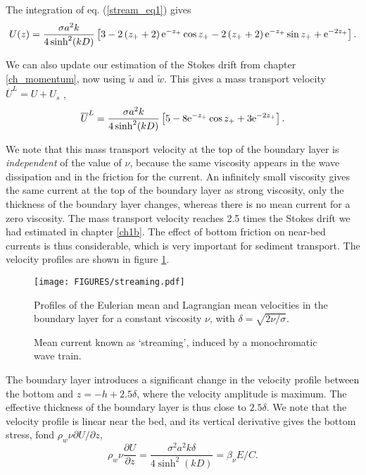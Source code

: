 The integration of eq. (\ref{stream_eq1}) gives 
\begin{equation}
U(z)= \frac{\sigma a^2 k}{4 \sinh^2(kD)} \left[3 - 2 \left(z_+ + 2\right) \mathrm{e}^{- z_+} \cos z_+
- 2 \left(z_+ +2\right) \mathrm{e}^{- z_+} \sin z_+
                                            + \mathrm{e}^{-2 z_+} \right].\label{ruissellement_Eulerien}
\end{equation}

We can also update our estimation of the Stokes drift from chapter \ref{ch_momentum}, now using   $\widetilde{u}$ and
$\widetilde{w}$. This gives a mass transport velocity $\overline{U}^L=U+U_s$ \citep{Longuet-Higgins1953}, 
\begin{equation}
\overline{U}^L= \frac{\sigma a^2 k}{4 \sinh^2(kD)} \left[5 - 8  \mathrm{e}^{- z_+} \cos z_+ +3  \mathrm{e}^{-2 z_+} \right].
\end{equation}

We note that this mass transport velocity at the top of the boundary layer 
is \emph{independent} of the value of $\nu$, because the same viscosity appears in the 
wave dissipation and in the friction for the current. An infinitely small viscosity gives the 
same current at the top of the boundary layer as strong viscosity, only the thickness of the boundary layer changes, whereas there is no mean current for a zero viscosity.
The mass transport velocity reaches 2.5 times the Stokes drift we had estimated in chapter \ref{ch1b}. The 
effect of bottom friction on near-bed currents is thus considerable, which is very important for sediment transport. The velocity profiles are shown in figure \ref{fig_streaming}. 
\begin{figure}
\centerline{\texttt{[image: FIGURES/streaming.pdf]}}
  \caption{Mean current known as `streaming', induced by a monochromatic wave train.}{Profiles of the Eulerian mean and Lagrangian mean 
  velocities in the boundary layer for a constant viscosity $\nu$, with $\delta=\sqrt{2 \nu/\sigma}$.}
   \label{fig_streaming}
\end{figure}
The boundary layer introduces a significant change in the velocity profile between the bottom and  $z=-h+2.5 \delta$, where the velocity amplitude is maximum. 
The effective thickness of the boundary layer is thus close to  $2.5 \delta$. We note that the velocity profile is linear near the bed, 
and its vertical derivative gives the bottom stress,  
fond $\rho_w \nu \partial U/\partial z$, 
\begin{equation}
 \rho_w \nu \frac{\partial U}{\partial z} =\frac{\sigma^2 a^2 k \delta}{4 \sinh^2(kD)}=
\beta_{\nu} E /C.
\end{equation}

